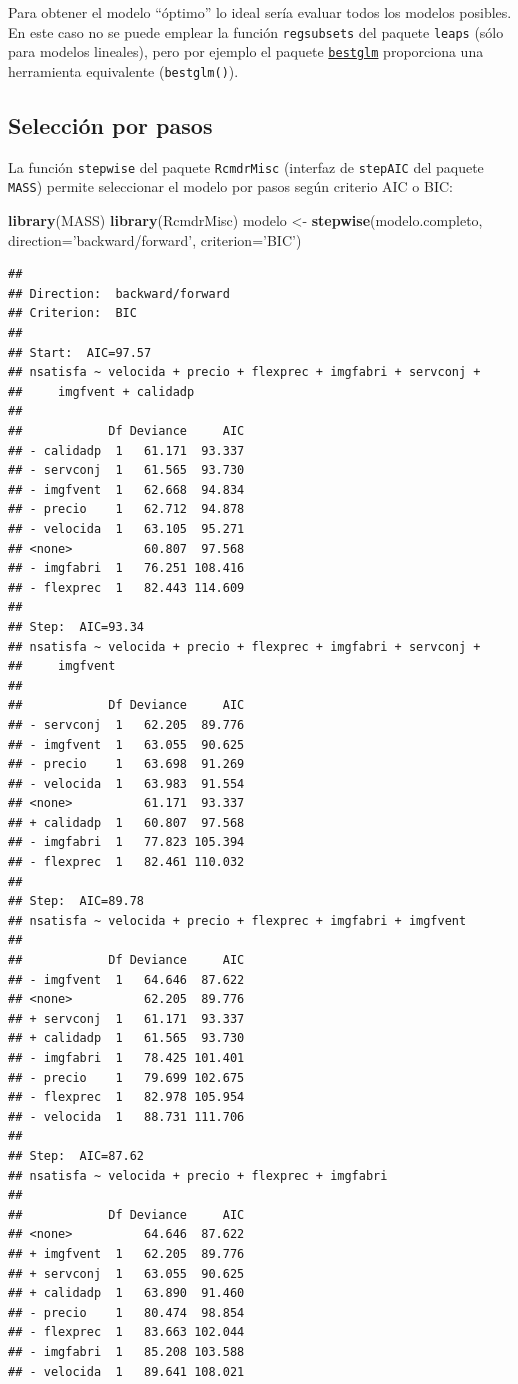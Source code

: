 \documentclass[]{book}
\newenvironment{Shaded}{\begin{snugshade}}{\end{snugshade}}
\newcommand{\KeywordTok}[1]{\textcolor[rgb]{0.13,0.29,0.53}{\textbf{#1}}}
\newcommand{\DataTypeTok}[1]{\textcolor[rgb]{0.13,0.29,0.53}{#1}}
\newcommand{\StringTok}[1]{\textcolor[rgb]{0.31,0.60,0.02}{#1}}
\newcommand{\NormalTok}[1]{#1}
\begin{document}
Para obtener el modelo ``óptimo'' lo ideal sería evaluar todos los
modelos posibles. En este caso no se puede emplear la función
\texttt{regsubsets} del paquete \texttt{leaps} (sólo para modelos
lineales), pero por ejemplo el paquete
\href{https://cran.r-project.org/web/packages/bestglm/vignettes/bestglm.pdf}{\texttt{bestglm}}
proporciona una herramienta equivalente (\texttt{bestglm()}).

\subsection{Selección por pasos}\label{seleccion-por-pasos-1}

La función \texttt{stepwise} del paquete \texttt{RcmdrMisc} (interfaz de
\texttt{stepAIC} del paquete \texttt{MASS}) permite seleccionar el
modelo por pasos según criterio AIC o BIC:

\begin{Shaded}
\begin{Highlighting}[]
\KeywordTok{library}\NormalTok{(MASS)}
\KeywordTok{library}\NormalTok{(RcmdrMisc)}
\NormalTok{modelo <-}\StringTok{ }\KeywordTok{stepwise}\NormalTok{(modelo.completo, }\DataTypeTok{direction=}\StringTok{'backward/forward'}\NormalTok{, }\DataTypeTok{criterion=}\StringTok{'BIC'}\NormalTok{)}
\end{Highlighting}
\end{Shaded}

\begin{verbatim}
## 
## Direction:  backward/forward
## Criterion:  BIC 
## 
## Start:  AIC=97.57
## nsatisfa ~ velocida + precio + flexprec + imgfabri + servconj + 
##     imgfvent + calidadp
## 
##            Df Deviance     AIC
## - calidadp  1   61.171  93.337
## - servconj  1   61.565  93.730
## - imgfvent  1   62.668  94.834
## - precio    1   62.712  94.878
## - velocida  1   63.105  95.271
## <none>          60.807  97.568
## - imgfabri  1   76.251 108.416
## - flexprec  1   82.443 114.609
## 
## Step:  AIC=93.34
## nsatisfa ~ velocida + precio + flexprec + imgfabri + servconj + 
##     imgfvent
## 
##            Df Deviance     AIC
## - servconj  1   62.205  89.776
## - imgfvent  1   63.055  90.625
## - precio    1   63.698  91.269
## - velocida  1   63.983  91.554
## <none>          61.171  93.337
## + calidadp  1   60.807  97.568
## - imgfabri  1   77.823 105.394
## - flexprec  1   82.461 110.032
## 
## Step:  AIC=89.78
## nsatisfa ~ velocida + precio + flexprec + imgfabri + imgfvent
## 
##            Df Deviance     AIC
## - imgfvent  1   64.646  87.622
## <none>          62.205  89.776
## + servconj  1   61.171  93.337
## + calidadp  1   61.565  93.730
## - imgfabri  1   78.425 101.401
## - precio    1   79.699 102.675
## - flexprec  1   82.978 105.954
## - velocida  1   88.731 111.706
## 
## Step:  AIC=87.62
## nsatisfa ~ velocida + precio + flexprec + imgfabri
## 
##            Df Deviance     AIC
## <none>          64.646  87.622
## + imgfvent  1   62.205  89.776
## + servconj  1   63.055  90.625
## + calidadp  1   63.890  91.460
## - precio    1   80.474  98.854
## - flexprec  1   83.663 102.044
## - imgfabri  1   85.208 103.588
## - velocida  1   89.641 108.021
\end{verbatim}
\end{document}
